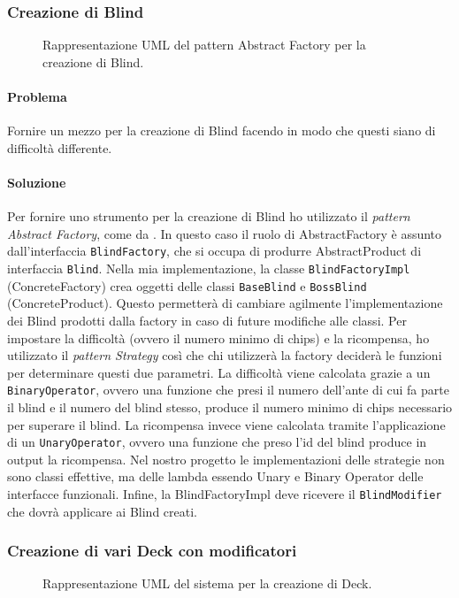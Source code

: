 \documentclass[a4paper,12pt]{report}
\begin{document}
\subsubsection*{Creazione di Blind}
\begin{figure}[H]
	\centering{}
	
	\caption{Rappresentazione UML del pattern Abstract Factory per la creazione di Blind.}
	\label{img:blindfactory}
\end{figure}
\paragraph{Problema}
Fornire un mezzo per la creazione di Blind facendo in modo che questi siano di difficoltà differente. 
\paragraph{Soluzione}
Per fornire uno strumento per la creazione di Blind ho utilizzato il \textit{pattern Abstract Factory}, come da .
In questo caso il ruolo di AbstractFactory è assunto dall’interfaccia \texttt{BlindFactory}, che si occupa di produrre AbstractProduct di interfaccia \texttt{Blind}.
Nella mia implementazione, la classe \texttt{BlindFactoryImpl} (ConcreteFactory) crea oggetti delle classi \texttt{BaseBlind} e \texttt{BossBlind} (ConcreteProduct).
Questo permetterà di cambiare agilmente l’implementazione dei Blind prodotti dalla factory in caso di future modifiche alle classi.
Per impostare la difficoltà (ovvero il numero minimo di chips) e la ricompensa, ho utilizzato il \textit{pattern Strategy} così che chi utilizzerà la factory deciderà le funzioni per determinare questi due parametri.
La difficoltà viene calcolata grazie a un  \texttt{BinaryOperator}, ovvero una funzione che presi il numero dell’ante di cui fa parte il blind e il numero del blind stesso, produce il numero minimo di chips necessario per superare il blind.
La ricompensa invece viene calcolata tramite l’applicazione di un  \texttt{UnaryOperator}, ovvero una funzione che preso l’id del blind produce in output la ricompensa.
Nel nostro progetto le implementazioni delle strategie non sono classi effettive, ma delle lambda essendo Unary e Binary Operator delle interfacce funzionali.
Infine, la BlindFactoryImpl deve ricevere il  \texttt{BlindModifier} che dovrà applicare ai Blind creati.

\subsubsection*{Creazione di vari Deck con modificatori}
\begin{figure}[H]
	\centering{}
	
	\caption{Rappresentazione UML del sistema per la creazione di Deck.}
	\label{img:buffeddeck}
\end{figure}
\end{document}
